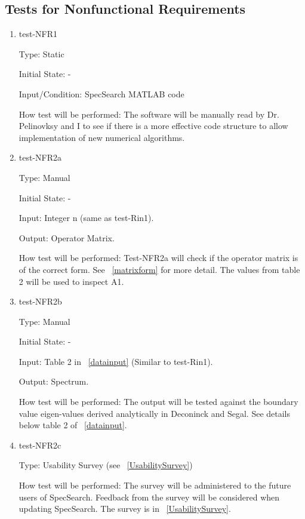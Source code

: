 \documentclass[12pt, titlepage]{article}
\begin{document}
\subsection{Tests for Nonfunctional Requirements}
\label{NFRtests}
\begin{enumerate}

\item{test-NFR1\\}

Type: Static
					
Initial State: -
					
Input/Condition: SpecSearch MATLAB code
					
How test will be performed: The software will be manually read by Dr. 
Pelinovksy and I to see if there is a more effective code structure to allow 
implementation of new numerical algorithms. 

\item{test-NFR2a\\} 

Type: Manual 

Initial State: -

Input: Integer n (same as test-Rin1).

Output: Operator Matrix.

How test will be performed: Test-NFR2a will check if the operator matrix is of 
the correct form. See ~\ref{matrixform} for more detail. The values from table 
2 
will be used to inspect A1.   \\

\item{test-NFR2b\\} 

Type: Manual 

Initial State: -

Input: Table 2 in ~\ref{datainput} (Similar to test-Rin1). 

Output: Spectrum.

How test will be performed: The output will be tested against the boundary 
value eigen-values derived analytically in Deconinck and Segal. See details 
below table 2 of ~\ref{datainput}. \\ 

\item{test-NFR2c\\} 

Type: Usability Survey (see ~\ref{UsabilitySurvey}) 

How test will be performed: The survey will be administered to the future users 
of SpecSearch. Feedback from the survey will be considered when updating 
SpecSearch. The survey is in ~\ref{UsabilitySurvey}. 

\end{enumerate}
\end{document}
